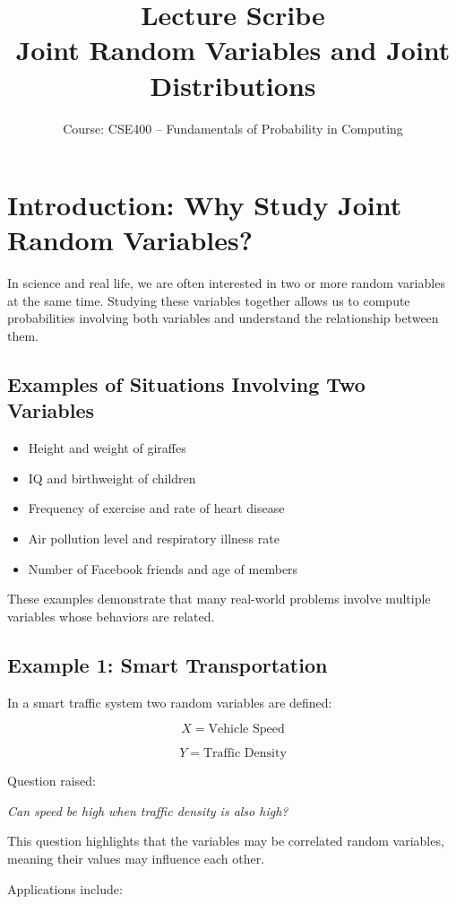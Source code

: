 \documentclass[12pt]{article}
\title{Lecture Scribe \\ Joint Random Variables and Joint Distributions}
\author{Course: CSE400 -- Fundamentals of Probability in Computing}
\date{}
\begin{document}
\maketitle

\section{Introduction: Why Study Joint Random Variables?}

In science and real life, we are often interested in two or more random variables at the same time. Studying these variables together allows us to compute probabilities involving both variables and understand the relationship between them.

\subsection*{Examples of Situations Involving Two Variables}

\begin{itemize}
\item Height and weight of giraffes
\item IQ and birthweight of children
\item Frequency of exercise and rate of heart disease
\item Air pollution level and respiratory illness rate
\item Number of Facebook friends and age of members
\end{itemize}

These examples demonstrate that many real-world problems involve multiple variables whose behaviors are related.

\subsection*{Example 1: Smart Transportation}

In a smart traffic system two random variables are defined:

\[
X = \text{Vehicle Speed}
\]

\[
Y = \text{Traffic Density}
\]

Question raised:

\textit{Can speed be high when traffic density is also high?}

This question highlights that the variables may be correlated random variables, meaning their values may influence each other.

Applications include:
\end{document}
